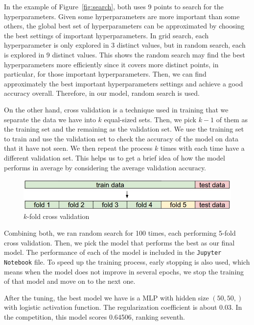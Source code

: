 \documentclass[12pt]{article}
\theoremstyle{remark}
\begin{document}
In the example of Figure~\ref{fig:search}, both uses 9 points to search for the hyperparameters. Given some hyperparameters are more important than some others, the global best set of hyperparameters can be approximated by choosing the best settings of important hyperparameters. In grid search, each hyperparameter is only explored in 3 distinct values, but in random search, each is explored in 9 distinct values. This shows the random search may find the best hyperparameters more efficiently since it covers more distinct points, in particular, for those important hyperparameters. Then, we can find approximately the best important hyperparameters settings and achieve a good accuracy overall. Therefore, in our model, random search is used.

On the other hand, cross validation is a technique used in training that we separate the data we have into \(k\) equal-sized sets. Then, we pick \(k-1\) of them as the training set and the remaining as the validation set. We use the training set to train and use the validation set to check the accuracy of the model on data that it have not seen. We then repeat the process \(k\) times with each time have a different validation set. This helps us to get a brief idea of how the model performs in average by considering the average validation accuracy.

\begin{figure}[!h]
	\centering
	\includegraphics[width=.9\textwidth]{cv}
	\caption{\(k\)-fold cross validation}
	\label{fig:cv}
\end{figure}

Combining both, we ran random search for 100 times, each performing 5-fold cross validation. Then, we pick the model that performs the best as our final model. The performance of each of the model is included in the \texttt{Jupyter Notebook} file. To speed up the training process, early stopping is also used, which means when the model does not improve in several epochs, we stop the training of that model and move on to the next one.

After the tuning, the best model we have is a MLP with hidden size \((50, 50, )\) with logistic activation function. The regularization coefficient is about 0.03. In the competition, this model scores 0.64506, ranking seventh.
\end{document}
